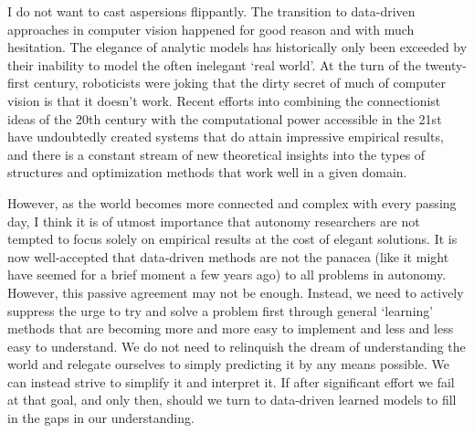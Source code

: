I do not want to cast aspersions flippantly.  The transition to data-driven approaches in computer vision happened for good reason and with much hesitation. The elegance of analytic models has historically only been exceeded by their inability to model the often inelegant `real world'. At the turn of the twenty-first century, roboticists were joking that the dirty secret of much of computer vision is that it doesn't work. Recent efforts into combining the connectionist ideas of the 20th century with the computational power accessible in the 21st have undoubtedly created systems that do attain impressive empirical results, and there is a constant stream of new theoretical insights into the types of structures	 and optimization methods that work well in a given domain.

However, as the world becomes more connected and complex with every passing day, I think it is of utmost importance that autonomy researchers are not tempted to focus solely on empirical results at the cost of elegant solutions. It is now well-accepted that data-driven methods are not the panacea (like it might have seemed for a brief moment a few years ago) to all problems in autonomy. However, this passive agreement may not be enough. Instead, we need to actively suppress the urge to try and solve a problem first through general `learning' methods that are becoming more and more easy to implement and less and less easy to understand.  We do not need to relinquish the dream of understanding the world and relegate ourselves to simply predicting it by any means possible. We can instead strive to simplify it and interpret it. If after significant effort we fail at that goal, and only then, should we turn to data-driven learned models to fill in the gaps in our understanding.

